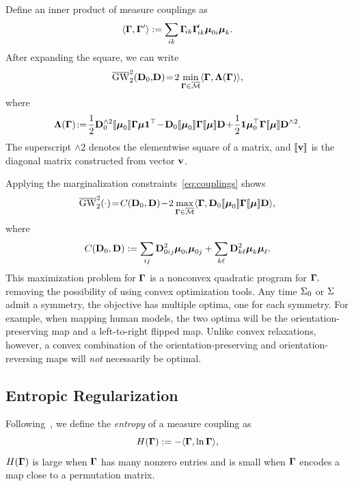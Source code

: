 Define an inner product of measure couplings as
$$\langle\mathbf \Gamma,\mathbf \Gamma'\rangle:=\sum_{ik} \mathbf \Gamma\!_{ik}\mathbf \Gamma\!_{ik}' \boldsymbol{\mu}_{0i}\boldsymbol{\mu}_k.$$
After expanding the square, we can write
\begin{equation}\label{eq:GW2_inner_prod}
\overline{\mathrm{GW}}_2^2(\mathbf D_0,\!\mathbf D)\!=\!
2\min_{\mathbf \Gamma\in\overline{\mathcal M}}\langle \mathbf \Gamma, \mathbf \Lambda(\mathbf \Gamma)\rangle,
\end{equation}
where
$$
\bL(\G)\!\eqdef\!
\frac{1}{2}\D_0^{\wedge2}\diag{\bmu_0}\G\bmu\1^\top
\!-\!\D_0\diag{\bmu_0}\G\diag{\bmu}\D
\!+\!\frac{1}{2}\1\bmu_0^\top \G\diag{\bmu}\D^{\wedge2}.
$$
The superscript $\wedge2$ denotes the elementwise square of a matrix, and $[\![\mathbf v]\!]$ is the diagonal matrix constructed from vector $\mathbf v$.

Applying the marginalization constraints~\eqref{eq:couplings} shows 
\begin{equation}\label{eq:discrete_optim_noreg}
\bGW_2^2(\cdot)
\!=\!
C(\D_0,\D)
\!-\!
2\max_{\G\in\bM} 
\langle \G,\D_0\diag{\bmu_0}\G\diag{\bmu}\D\rangle,
\end{equation}
where
$$C(\mathbf D_0,\mathbf D):=\sum_{ij}\mathbf D_{0ij}^2\boldsymbol{\mu}_{0i}\boldsymbol{\mu}_{0j} + \sum_{k\ell}\mathbf D_{k\ell}^2\boldsymbol{\mu}_k\boldsymbol{\mu}_\ell.$$
This maximization problem for $\mathbf \Gamma$ %
is a nonconvex quadratic program for $\mathbf \Gamma,$ removing the possibility of using convex optimization tools.  Any time $\Sigma_0$ or $\Sigma$ admit a symmetry, the objective has multiple optima, one for each symmetry.  For example, when mapping human models, the two optima will be the orientation-preserving map and a left-to-right flipped map.  Unlike convex relaxations, however, a convex combination of the orientation-preserving and orientation-reversing maps will \emph{not} necessarily be optimal.


\subsection{Entropic Regularization}\label{sec:entropic_reg}

Following~\cite{solomon-2015}, we define the \emph{entropy} of a measure coupling as
$$H(\mathbf \Gamma):= -
\langle \mathbf \Gamma,\ln\mathbf \Gamma\rangle,
$$
$H(\mathbf \Gamma)$ is large when $\mathbf \Gamma$ has many nonzero entries and is small when $\mathbf \Gamma$ encodes a map close to a permutation matrix.  

